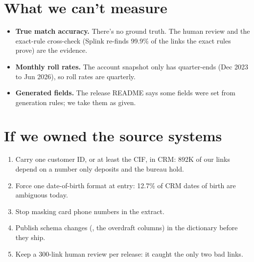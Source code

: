\documentclass[11pt]{article}
\begin{document}
\section{What we can't measure}

\begin{itemize}
\item \textbf{True match accuracy.} There's no ground truth. The human review and the exact-rule cross-check (Splink
re-finds 99.9\% of the links the exact rules prove) are the evidence.
\item \textbf{Monthly roll rates.} The account snapshot only has quarter-ends (Dec 2023 to Jun 2026), so roll rates are
quarterly.
\item \textbf{Generated fields.} The release README says some fields were set from generation rules; we take them as given.
\end{itemize}

\section{If we owned the source systems}

\begin{enumerate}
\item Carry one customer ID, or at least the CIF, in CRM: 892K of our links depend on a number only deposits and the
bureau hold.
\item Force one date-of-birth format at entry: 12.7\% of CRM dates of birth are ambiguous today.
\item Stop masking card phone numbers in the extract.
\item Publish schema changes (, the overdraft columns) in the dictionary before they ship.
\item Keep a 300-link human review per release: it caught the only two bad links.
\end{enumerate}

\end{document}
